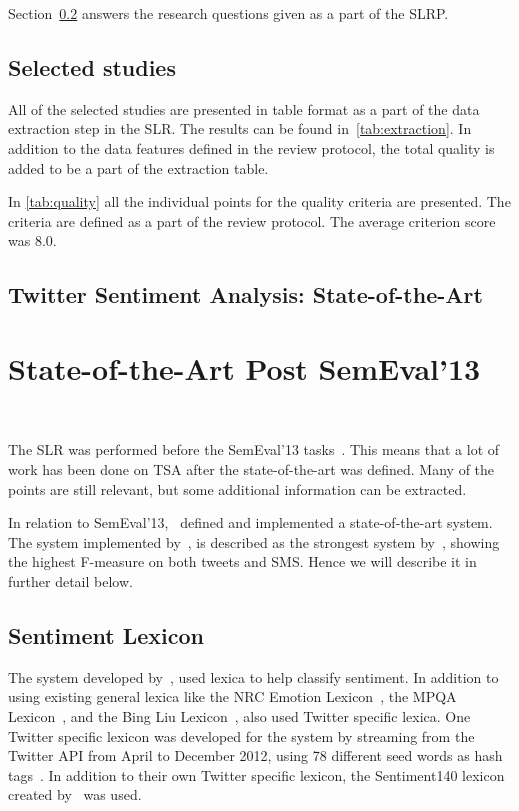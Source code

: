 Section~\ref{sec:stateofart} answers the research questions given as a part of the SLRP. 

\subsection{Selected studies} 
\label{sec:selected}

All of the selected studies are presented in table format as a part of the data extraction step in the SLR. The results can be found in~\autoref{tab:extraction}. In addition to the data features defined in the review protocol, the total quality is added to be a part of the extraction table.



In \autoref{tab:quality} all the individual points for the quality criteria are presented. The criteria are defined as a part of the review protocol. The average criterion score was 8.0.



\subsection{Twitter Sentiment Analysis: State-of-the-Art}
\label{sec:stateofart}


\section{State-of-the-Art Post SemEval'13}~\label{sec:stateofart_post}

The SLR was performed before the SemEval'13 tasks~\citep{WilsonEA:13}. This means that a lot of work has been done on TSA after the state-of-the-art was defined. Many of the points are still relevant, but some additional information can be extracted. 

In relation to SemEval'13,~\cite{MohammadEA:13} defined and implemented a state-of-the-art system. The system implemented by~\cite{MohammadEA:13}, is described as the strongest system by~\cite{WilsonEA:13}, showing the highest F-measure on both tweets and SMS. Hence we will describe it in further detail below.

\subsection{Sentiment Lexicon}

The system developed by~\cite{MohammadEA:13}, used lexica to help classify sentiment. In addition to using existing general lexica like the NRC Emotion Lexicon~\citep{mohammad2010emotions, mohammad2011tracking}, the MPQA Lexicon~\citep{wilson2005recognizing}, and the Bing Liu Lexicon~\citep{hu2004mining}, \cite{MohammadEA:13} also used Twitter specific lexica. One Twitter specific lexicon was developed for the system by streaming from the Twitter API from April to December 2012, using 78 different seed words as hash tags~\citep{MohammadEA:13}. In addition to their own Twitter specific lexicon, the Sentiment140 lexicon created by~\cite{article:go} was used.

